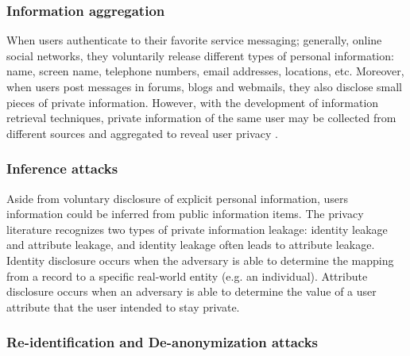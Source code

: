 \subsubsection{Information aggregation}

When users authenticate to their favorite service messaging;
	generally,
	online social networks,
	they voluntarily release different types of personal information: name,
	screen name,
	telephone numbers,
	email addresses,
	locations,
	etc.
Moreover,
	when users post messages in forums, blogs and webmails,
	they also disclose small pieces of private information.
However,
	with the development of information retrieval techniques,
	private information of the same user may be collected from different sources and aggregated to reveal user privacy \cite{luo_protecting_2009}.
	
\subsubsection{Inference attacks}

Aside from voluntary disclosure of explicit personal information,
	users information could be inferred from public information items.
The privacy literature recognizes two types of private information leakage:
	identity leakage and attribute leakage,
	and identity leakage often leads to attribute leakage.
Identity disclosure occurs when the adversary is able to determine the mapping from a record to a specific real-world entity (e.g. an individual).
Attribute disclosure occurs when an adversary is able to determine the value of a user attribute that the user intended to stay private.

%	
\subsubsection{Re-identification and De-anonymization attacks}

